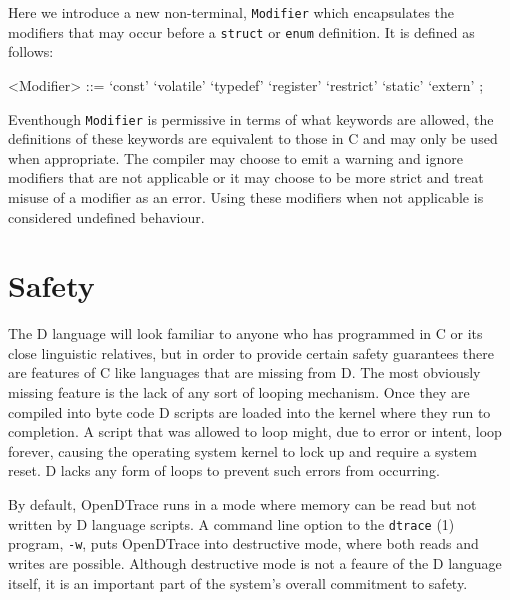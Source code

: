 \noindent
Here we introduce a new non-terminal, \texttt{Modifier} which encapsulates the
modifiers that may occur before a \texttt{struct} or \texttt{enum} definition.
It is defined as follows:

\begin{grammar}
<Modifier> ::= `const'
	\alt `volatile'
	\alt `typedef'
	\alt `register'
	\alt `restrict'
	\alt `static'
	\alt `extern' ;
\end{grammar}

Eventhough \texttt{Modifier} is permissive in terms of what keywords are
allowed, the definitions of these keywords are equivalent to those in C and may
only be used when appropriate. The compiler may choose to emit a warning and
ignore modifiers that are not applicable or it may choose to be more strict and
treat misuse of a modifier as an error. Using these modifiers when not
applicable is considered undefined behaviour. \newline

\section{Safety}
\label{sec:safety}

The D language will look familiar to anyone who has programmed in C or
its close linguistic relatives, but in order to provide certain
safety guarantees there are features of C like languages that are
missing from D.  The most obviously missing feature is the lack of any
sort of looping mechanism.  Once they are compiled into byte code D
scripts are loaded into the kernel where they run to completion.  A
script that was allowed to loop might, due to error or intent, loop
forever, causing the operating system kernel to lock up and require a
system reset.  D lacks any form of loops to prevent such errors from
occurring.

By default, OpenDTrace runs in a mode where memory can be read but not
written by D language scripts.  A command line option to the \texttt{dtrace} (1)
program, \texttt{-w}, puts OpenDTrace into destructive mode, where both reads
and writes are possible.  Although destructive mode is not a feaure of
the D language itself, it is an important part of the system's overall
commitment to safety.



